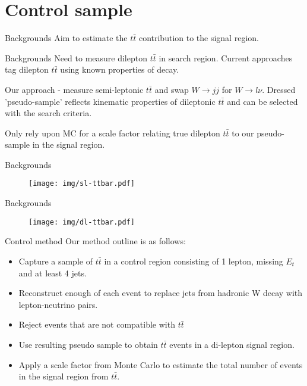 \documentclass{beamer}
\begin{document}
\section{Control sample}
\begin{frame}{Backgrounds}
Aim to estimate the $t\bar{t}$ contribution to the signal region.
\end{frame}

\begin{frame}{Backgrounds}
Need to measure dilepton $t\bar{t}$ in search region. Current approaches tag dilepton $t\bar{t}$ using known properties of decay.

Our approach - measure semi-leptonic $t\bar{t}$ and swap $W\rightarrow jj$ for $W\rightarrow l\nu$. Dressed 'pseudo-sample' reflects kinematic properties of dileptonic $t\bar{t}$ and can be selected with the search criteria.

Only rely upon MC for a scale factor relating true dilepton $t\bar{t}$ to our pseudo-sample in the signal region.
\end{frame}

\begin{frame}{Backgrounds}
  \begin{figure}
    \centering
    \texttt{[image: img/sl-ttbar.pdf]}
  \end{figure}
\end{frame}

\begin{frame}{Backgrounds}
  \begin{figure}
    \centering
    \texttt{[image: img/dl-ttbar.pdf]}
  \end{figure}
\end{frame}

\begin{frame}{Control method}
Our method outline is as follows:
  \begin{itemize}
    \item Capture a sample of $t \bar{t}$ in a control region consisting of 1 lepton, missing $E_{t}$ and at least 4 jets.
    \item Reconstruct enough of each event to replace jets from hadronic W decay with lepton-neutrino pairs.
    \item Reject events that are not compatible with $t \bar{t}$
    \item Use resulting pseudo sample to obtain $t \bar{t}$ events in a di-lepton signal region.
    \item Apply a scale factor from Monte Carlo to estimate the total number of events in the signal region from $t \bar{t}$.
  \end{itemize}
\end{frame}
\end{document}
